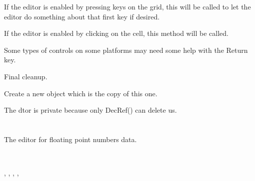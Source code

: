 
If the editor is enabled by pressing keys on the grid,
this will be called to let the editor do something about
that first key if desired.

\label{wxgridcelleditorstartingclick}


If the editor is enabled by clicking on the cell, this method will be
called.

\label{wxgridcelleditorhandlereturn}


Some types of controls on some platforms may need some help
with the Return key.

\label{wxgridcelleditordestroy}


Final cleanup.

\label{wxgridcelleditorclone}


Create a new object which is the copy of this one.

\label{wxgridcelleditordtor}


The dtor is private because only DecRef() can delete us.


\section{}\label{wxgridcellfloateditor}

The editor for floating point numbers data.


\\


,\rtfsp
{},\rtfsp
{},\rtfsp
{},\rtfsp
{}

